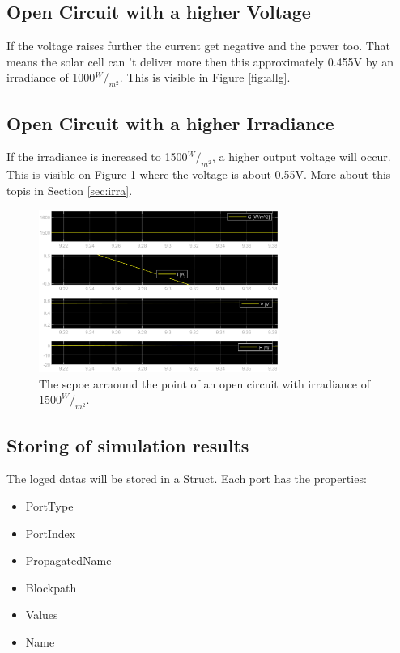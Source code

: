 	\subsection{Open Circuit with a higher Voltage}
	If the voltage raises further  the current get negative and the power too. That means the solar cell can 't deliver more then this approximately 0.455V by an irradiance of 1000$^W/_{m^2}$. This is visible in Figure \ref{fig:allg}.
	
	\subsection{Open Circuit with a higher Irradiance}
	If the irradiance is increased to 1500$^W/_{m^2}$, a higher output voltage will occur. This is visible on Figure \ref{fig:openc1500} where the voltage is about 0.55V. More about this topis in Section \ref{sec:irra}.
	
		
		\begin{figure}[H]
			\centering
			\includegraphics[width=0.7\textwidth]{figures/openc1500.eps}
			\caption{The scpoe arraound the point of an open circuit with irradiance  of $1500^W/_{m^2}$.}
			\label{fig:openc1500}
		\end{figure}
	
	\subsection{Storing of simulation results}
	The loged datas will be stored in a Struct. Each port has the properties:
		\begin{itemize}
			\item PortType
			\item PortIndex
			\item PropagatedName
			\item Blockpath
			\item Values
			\item Name
		\end{itemize}
	
